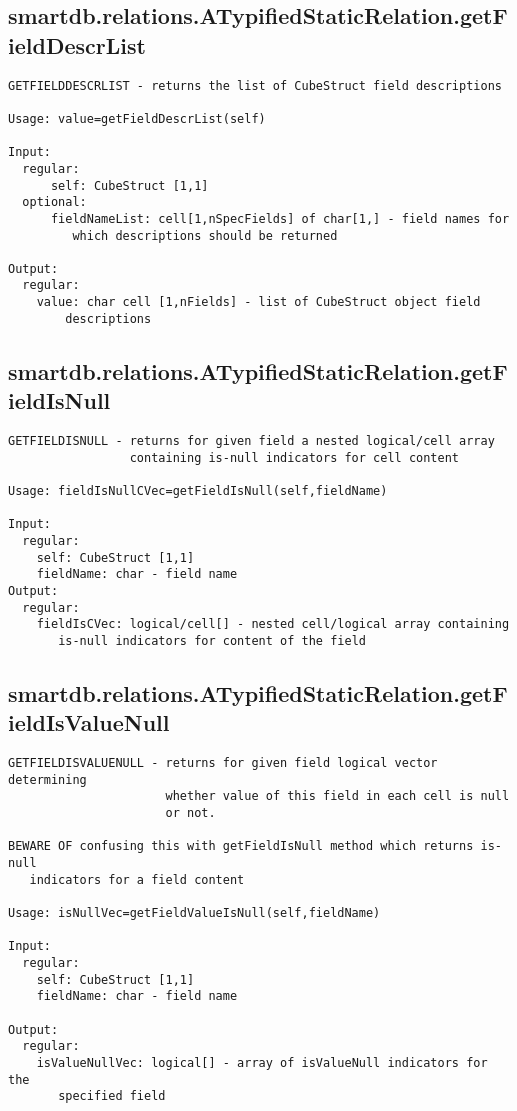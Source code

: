 \subsection{\texorpdfstring{smartdb.relations.ATypifiedStaticRelation.getFieldDescrList}{getFieldDescrList}}\label{method:smartdb.relations.ATypifiedStaticRelation.getFieldDescrList}
\begin{verbatim}
GETFIELDDESCRLIST - returns the list of CubeStruct field descriptions

Usage: value=getFieldDescrList(self)

Input:
  regular:
      self: CubeStruct [1,1]
  optional:
      fieldNameList: cell[1,nSpecFields] of char[1,] - field names for
         which descriptions should be returned

Output:
  regular:
    value: char cell [1,nFields] - list of CubeStruct object field
        descriptions
\end{verbatim}
\subsection{\texorpdfstring{smartdb.relations.ATypifiedStaticRelation.getFieldIsNull}{getFieldIsNull}}\label{method:smartdb.relations.ATypifiedStaticRelation.getFieldIsNull}
\begin{verbatim}
GETFIELDISNULL - returns for given field a nested logical/cell array
                 containing is-null indicators for cell content

Usage: fieldIsNullCVec=getFieldIsNull(self,fieldName)

Input:
  regular:
    self: CubeStruct [1,1]
    fieldName: char - field name
Output:
  regular:
    fieldIsCVec: logical/cell[] - nested cell/logical array containing
       is-null indicators for content of the field
\end{verbatim}
\subsection{\texorpdfstring{smartdb.relations.ATypifiedStaticRelation.getFieldIsValueNull}{getFieldIsValueNull}}\label{method:smartdb.relations.ATypifiedStaticRelation.getFieldIsValueNull}
\begin{verbatim}
GETFIELDISVALUENULL - returns for given field logical vector determining
                      whether value of this field in each cell is null
                      or not.

BEWARE OF confusing this with getFieldIsNull method which returns is-null
   indicators for a field content

Usage: isNullVec=getFieldValueIsNull(self,fieldName)

Input:
  regular:
    self: CubeStruct [1,1]
    fieldName: char - field name

Output:
  regular:
    isValueNullVec: logical[] - array of isValueNull indicators for the
       specified field
\end{verbatim}
